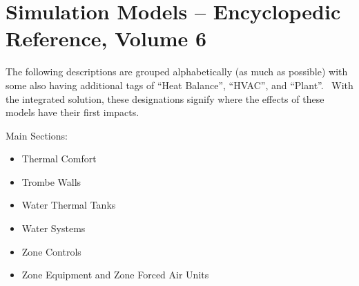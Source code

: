 \chapter{Simulation Models -- Encyclopedic Reference, Volume 6}\label{simulation-models---encyclopedic-reference-005}

The following descriptions are grouped alphabetically (as much as possible) with some also having additional tags of ``Heat Balance'', ``HVAC'', and ``Plant''.~ With the integrated solution, these designations signify where the effects of these models have their first impacts.

Main Sections:

\begin{itemize}
  \tightlist
  \item Thermal Comfort
  \item Trombe Walls
  \item Water Thermal Tanks
  \item Water Systems
  \item Zone Controls
  \item Zone Equipment and Zone Forced Air Units
\end{itemize}
